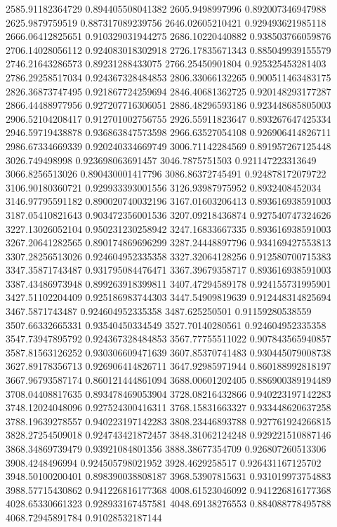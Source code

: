 {2585.91182364729 0.894405508041382
2605.9498997996 0.892007346947988
2625.9879759519 0.887317089239756
2646.02605210421 0.929493621985118
2666.06412825651 0.910329031944275
2686.10220440882 0.938503766059876
2706.14028056112 0.924083018302918
2726.17835671343 0.885049939155579
2746.21643286573 0.89231288433075
2766.25450901804 0.925325453281403
2786.29258517034 0.924367328484853
2806.33066132265 0.900511463483175
2826.36873747495 0.921867724259694
2846.40681362725 0.920148293177287
2866.44488977956 0.927207716306051
2886.48296593186 0.923448685805003
2906.52104208417 0.912701002756755
2926.55911823647 0.893267647425334
2946.59719438878 0.936863847573598
2966.63527054108 0.926906414826711
2986.67334669339 0.920240334669749
3006.71142284569 0.891957267125448
3026.749498998 0.923698063691457
3046.7875751503 0.921147223313649
3066.8256513026 0.890430001417796
3086.86372745491 0.924878172079722
3106.90180360721 0.929933393001556
3126.93987975952 0.8932408452034
3146.97795591182 0.890020740032196
3167.01603206413 0.893616938591003
3187.05410821643 0.903472356001536
3207.09218436874 0.927540747324626
3227.13026052104 0.950231230258942
3247.16833667335 0.893616938591003
3267.20641282565 0.890174869696299
3287.24448897796 0.934169427553813
3307.28256513026 0.924604952335358
3327.32064128256 0.912580700715383
3347.35871743487 0.931795084476471
3367.39679358717 0.893616938591003
3387.43486973948 0.899263918399811
3407.47294589178 0.924155731995901
3427.51102204409 0.925186983744303
3447.54909819639 0.912448314825694
3467.5871743487 0.924604952335358
3487.625250501 0.91159280538559
3507.66332665331 0.93540450334549
3527.70140280561 0.924604952335358
3547.73947895792 0.924367328484853
3567.77755511022 0.907843565940857
3587.81563126252 0.930306609471639
3607.85370741483 0.930445079008738
3627.89178356713 0.926906414826711
3647.92985971944 0.860188992818197
3667.96793587174 0.860121444861094
3688.00601202405 0.886900389194489
3708.04408817635 0.893478469053904
3728.08216432866 0.940223197142283
3748.12024048096 0.927524300416311
3768.15831663327 0.933448620637258
3788.19639278557 0.940223197142283
3808.23446893788 0.927761924266815
3828.27254509018 0.924743421872457
3848.31062124248 0.929221510887146
3868.34869739479 0.93921084801356
3888.38677354709 0.926807260513306
3908.4248496994 0.924505798021952
3928.4629258517 0.926431167125702
3948.50100200401 0.898390038808187
3968.53907815631 0.931019973754883
3988.57715430862 0.941226816177368
4008.61523046092 0.941226816177368
4028.65330661323 0.928933167457581
4048.69138276553 0.884088778495788
4068.72945891784 0.91028532187144
}
